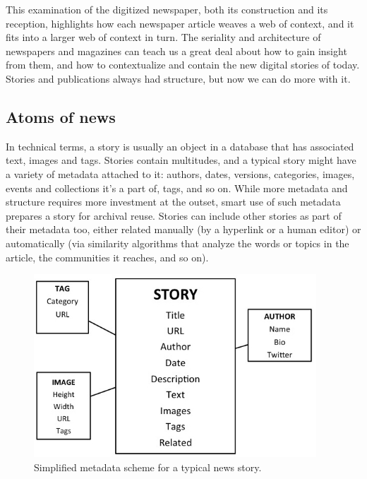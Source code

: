 This examination of the digitized newspaper, both its construction and its reception, highlights how each newspaper article weaves a web of context, and it fits into a larger web of context in turn. The seriality and architecture of newspapers and magazines can teach us a great deal about how to gain insight from them, and how to contextualize and contain the new digital stories of today. Stories and publications always had structure, but now we can do more with it.

\subsection{Atoms of news}

In technical terms, a story is usually an object in a database that has associated text, images and tags. Stories contain multitudes, and a typical story might have a variety of metadata attached to it: authors, dates, versions, categories, images, events and collections it's a part of, tags, and so on. While more metadata and structure requires more investment at the outset, smart use of such metadata prepares a story for archival reuse. Stories can include other stories as part of their metadata too, either related manually (by a hyperlink or a human editor) or automatically (via similarity algorithms that analyze the words or topics in the article, the communities it reaches, and so on).

\begin{figure}[ht]
\centering
\includegraphics[width=300pt]{figures/storyschema}
\caption{Simplified metadata scheme for a typical news story.}
\label{fig:storyschema}
\end{figure}


